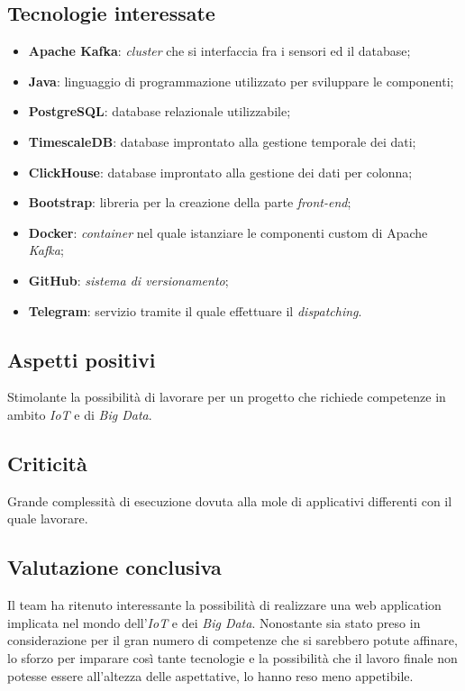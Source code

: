 \subsection{Tecnologie interessate}
\begin{itemize}
	\item \textbf{Apache Kafka\glos}: \textit{cluster\glo} che si interfaccia fra i sensori ed il database;
	\item \textbf{Java}: linguaggio di programmazione utilizzato per sviluppare le componenti;
	\item \textbf{PostgreSQL}: database relazionale utilizzabile;
	\item \textbf{TimescaleDB}: database improntato alla gestione temporale dei dati;
	\item \textbf{ClickHouse}: database improntato alla gestione dei dati per colonna;
	\item \textbf{Bootstrap}: libreria per la creazione della parte \textit{front-end\glos};
	\item \textbf{Docker\glos}: \textit{container\glo} nel quale istanziare le componenti custom di Apache \textit{Kafka\glos};
	\item \textbf{GitHub\glos}: \textit{sistema di versionamento\glos};
	\item \textbf{Telegram}: servizio tramite il quale effettuare il \textit{dispatching\glos}.
\end{itemize}

\subsection{Aspetti positivi}
Stimolante la possibilità di lavorare per un progetto che richiede competenze in ambito \textit{IoT\glo} e di \textit{Big Data\glos}.


\subsection{Criticità}
Grande complessità di esecuzione dovuta alla mole di applicativi differenti con il quale lavorare.

\subsection{Valutazione conclusiva}
Il team ha ritenuto interessante la possibilità di realizzare una web application implicata nel mondo dell'\textit{IoT\glo} e dei \textit{Big Data\glos}. Nonostante sia stato preso in considerazione per il gran numero di competenze che si sarebbero potute affinare, lo sforzo per imparare così tante tecnologie e la possibilità che il lavoro finale non potesse essere all'altezza delle aspettative, lo hanno reso meno appetibile.